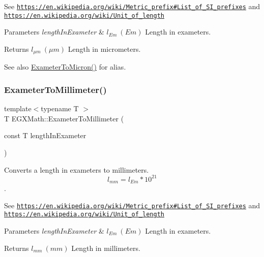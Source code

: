 See \href{https://en.wikipedia.org/wiki/Metric_prefix#List_of_SI_prefixes}{\tt https\+://en.\+wikipedia.\+org/wiki/\+Metric\+\_\+prefix\#\+List\+\_\+of\+\_\+\+S\+I\+\_\+prefixes} and \href{https://en.wikipedia.org/wiki/Unit_of_length}{\tt https\+://en.\+wikipedia.\+org/wiki/\+Unit\+\_\+of\+\_\+length} 
\begin{DoxyParams}{Parameters}
{\em length\+In\+Exameter} & $ l_{Em}\ (Em)$ Length in exameters. \\
\hline
\end{DoxyParams}
\begin{DoxyReturn}{Returns}
$ l_{\mu m}\ (\mu m)$ Length in micrometers. 
\end{DoxyReturn}
\begin{DoxySeeAlso}{See also}
\mbox{\hyperlink{group___e_g_x_math-_conversions-_length_conversions-_s_i-_exameter-_non-_s_i_ga3356bb6585e02757a196b299c29660c1}{Exameter\+To\+Micron()}} for alias. 
\end{DoxySeeAlso}
\mbox{\label{group___e_g_x_math-_conversions-_length_conversions-_s_i-_exameter-_s_i_ga71baa21a517793479c9bbb9e1a5c713b}} 
\subsubsection{\texorpdfstring{Exameter\+To\+Millimeter()}{ExameterToMillimeter()}}
{\footnotesize\ttfamily template$<$typename T $>$ \\
T E\+G\+X\+Math\+::\+Exameter\+To\+Millimeter (\begin{DoxyParamCaption}\item[{const T}]{length\+In\+Exameter }\end{DoxyParamCaption})}



Converts a length in exameters to millimeters. \[ l_{mm}=l_{Em} * 10^{21} \]. 

See \href{https://en.wikipedia.org/wiki/Metric_prefix#List_of_SI_prefixes}{\tt https\+://en.\+wikipedia.\+org/wiki/\+Metric\+\_\+prefix\#\+List\+\_\+of\+\_\+\+S\+I\+\_\+prefixes} and \href{https://en.wikipedia.org/wiki/Unit_of_length}{\tt https\+://en.\+wikipedia.\+org/wiki/\+Unit\+\_\+of\+\_\+length} 
\begin{DoxyParams}{Parameters}
{\em length\+In\+Exameter} & $ l_{Em}\ (Em)$ Length in exameters. \\
\hline
\end{DoxyParams}
\begin{DoxyReturn}{Returns}
$ l_{mm}\ (mm)$ Length in millimeters. 
\end{DoxyReturn}
\mbox{\label{group___e_g_x_math-_conversions-_length_conversions-_s_i-_exameter-_s_i_ga78c5c3f8008fc44c81b3d89b44d3db19}} 
